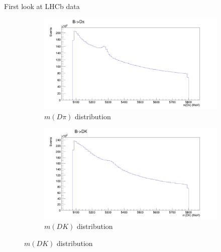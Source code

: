 \documentclass{beamer}
\begin{document}
\begin{frame}{First look at LHCb data}
  \begin{figure}
    \centering
    \vspace{-0.2cm}
    \begin{subfigure}{0.5\textwidth}
      \includegraphics[width = 1.0\textwidth]{BMassBeforeCutsB2DPi.png}
      \caption{$m(D\pi)$ distribution}
    \end{subfigure}%
    \begin{subfigure}{0.5\textwidth}
      \includegraphics[width = 1.0\textwidth]{BMassBeforeCutsB2DK.png}
      \caption{$m(DK)$ distribution}
    \end{subfigure}
  \end{figure}
\end{frame}
\end{document}
